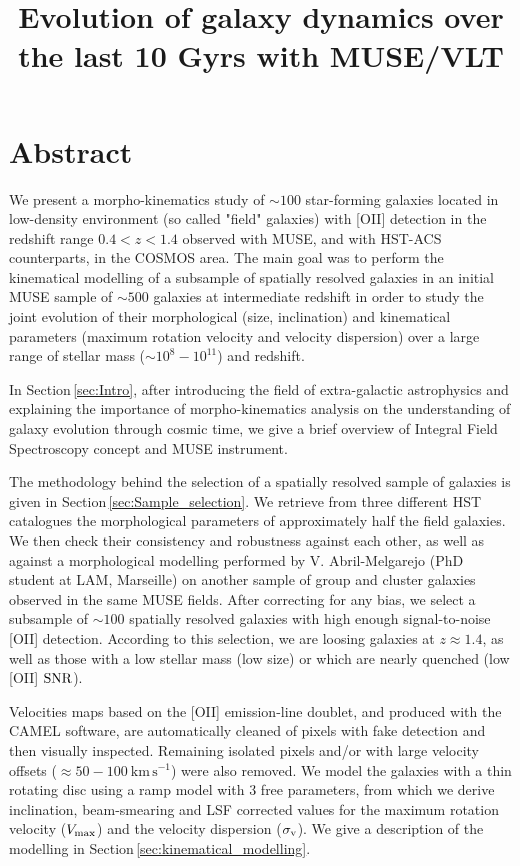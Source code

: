 \documentclass[a4paper, twoside, 11pt]{article}
\title{Evolution of galaxy dynamics over the last 10 Gyrs with MUSE/VLT}
\begin{document}


\clearpage
\thispagestyle{empty}
\section*{Abstract}

We present a morpho-kinematics study of $\sim 100$ star-forming galaxies located in low-density environment (so called "field" galaxies) with [OII] detection in the redshift range $0.4 < z < 1.4$ observed with MUSE, and with HST-ACS counterparts, in the COSMOS area. The main goal was to perform the kinematical modelling of a subsample of spatially resolved galaxies in an initial MUSE sample of $\sim 500$ galaxies at intermediate redshift in order to study the joint evolution of their morphological (size, inclination) and kinematical parameters (maximum rotation velocity and velocity dispersion) over a large range of stellar mass ($\sim 10^8 - 10^{11}$) and redshift. 

In Section\,\ref{sec:Intro}, after introducing the field of extra-galactic astrophysics and explaining the importance of morpho-kinematics analysis on the understanding of galaxy evolution through cosmic time, we give a brief overview of Integral Field Spectroscopy concept and MUSE instrument.

The methodology behind the selection of a spatially resolved sample of galaxies is given in Section\,\ref{sec:Sample_selection}. We retrieve from three different HST catalogues the morphological parameters of approximately half the field galaxies. We then check their consistency and robustness against each other, as well as against a morphological modelling performed by V. Abril-Melgarejo (PhD student at LAM, Marseille) on another sample of group and cluster galaxies observed in the same MUSE fields. After correcting for any bias, we select a subsample of $\sim 100$ spatially resolved galaxies with high enough signal-to-noise [OII] detection. According to this selection, we are loosing galaxies at $z \approx 1.4$, as well as those with a low stellar mass (low size) or which are nearly quenched (low [OII] $\rm{SNR}$).

Velocities maps based on the [OII] emission-line doublet, and produced with the CAMEL software, are automatically cleaned of pixels with fake detection and then visually inspected. Remaining isolated pixels and/or with large velocity offsets ($\approx 50 - \SI{100}{\kilo\meter \, \second^{-1}}$) were also removed. We model the galaxies with a thin rotating disc  using a ramp model with $3$ free parameters, from which we derive inclination, beam-smearing and LSF corrected values for the maximum rotation velocity ($V_{\rm{max}}$) and the velocity dispersion ($\sigma_{\rm{v}}$). We give a description of the modelling in Section\,\ref{sec:kinematical_modelling}.
\end{document}
